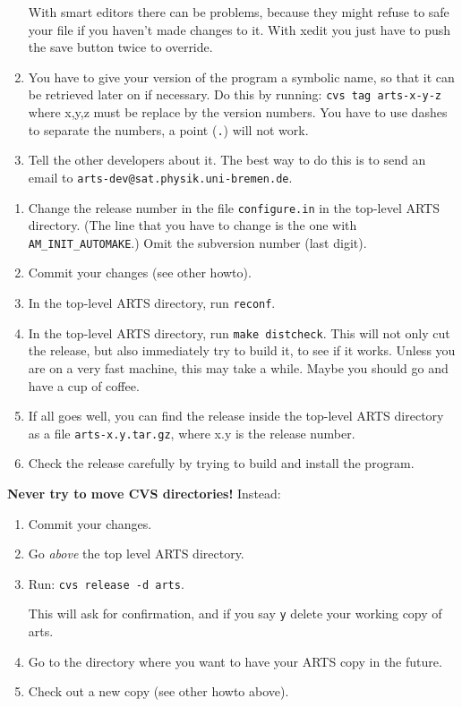 \begin{enumerate}
  With smart editors there can be problems, because they might
  refuse to safe your file if you haven't made changes to it. With
  xedit you just have to push the save button twice to override.
\item You have to give your version of the program a symbolic name, so
  that it can be retrieved later on if necessary. Do this by running:
  \verb|cvs tag arts-x-y-z| where x,y,z must be replace by the version
  numbers. You have to use dashes to separate the numbers, a point
  (\verb|.|) will not work.
\item Tell the other developers about it. The best way to do this is
  to send an email to \verb|arts-dev@sat.physik.uni-bremen.de|.
\end{enumerate}


\label{sec:release}
\begin{enumerate}
\item Change the release number in the file \verb|configure.in| in the
  top-level ARTS directory. (The line that you have to change is the
  one with \verb|AM_INIT_AUTOMAKE|.) Omit the subversion number (last digit).
\item Commit your changes (see other howto). 
\item In the top-level ARTS directory, run \verb|reconf|.
\item In the top-level ARTS directory, run \verb|make distcheck|. This
  will not only cut the release, but also immediately try to build
  it, to see if it works. Unless you are on a very fast machine, this
  may take a while. Maybe you should go and have a cup of coffee.
\item If all goes well, you can find the release inside the top-level
  ARTS directory as a file \verb|arts-x.y.tar.gz|, where x.y is the
  release number.
\item Check the release carefully by trying to build and install the
  program. 
\end{enumerate}


\textbf{Never try to move CVS directories!} Instead:
\begin{enumerate}
\item Commit your changes.
\item Go \emph{above} the top level ARTS directory.
\item Run: \verb|cvs release -d arts|.
  
  This will ask for confirmation, and if you say \verb|y| delete your
  working copy of arts.
\item Go to the directory where you want to have your ARTS copy in the
  future.
\item Check out a new copy (see other howto above).
\end{enumerate}

